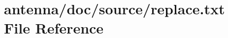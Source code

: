 \hypertarget{antenna_2doc_2source_2replace_8txt}{}\section{antenna/doc/source/replace.txt File Reference}
\label{antenna_2doc_2source_2replace_8txt}
